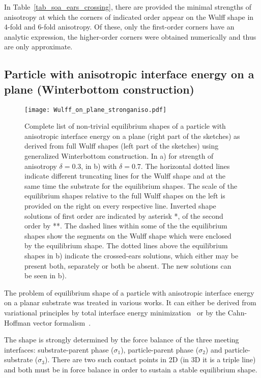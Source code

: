 	In Table~\ref{tab_soa_ears_crossing}, there are provided the minimal strengths of anisotropy at which the corners of indicated order appear on the Wulff shape in 4-fold and 6-fold anisotropy. Of these, only the first-order corners have an analytic expression, the higher-order corners were obtained numerically and thus are only approximate.
	
	\subsection{Particle with anisotropic interface energy on a plane (Winterbottom construction)}
	\begin{figure}[h]
		\centering
		\texttt{[image: Wulff\_on\_plane\_stronganiso.pdf]}
		\caption[Complete list of non-trivial equilibrium shapes of a particle with anisotropic interface energy on a plane]{Complete list of non-trivial equilibrium shapes of a particle with anisotropic interface energy on a plane (right part of the sketches) as derived from full Wulff shapes (left part of the sketches) using generalized Winterbottom construction. In a) for strength of anisotropy $\delta=0.3$, in b) with $\delta=0.7$. The horizontal dotted lines indicate different truncating lines for the Wulff shape and at the same time the substrate for the equilibrium shapes. The scale of the equilibrium shapes relative to the full Wulff shapes on the left is provided on the right on every respective line. Inverted shape solutions of first order are indicated by asterisk *, of the second order by **. The dashed lines within some of the the equilibrium shapes show the segments on the Wulff shape which were enclosed by the equilibrium shape. The dotted lines above the equilibrium shapes in b) indicate the crossed-ears solutions, which either may be present both, separately or both be absent. The new solutions can be seen in b).}
		\label{fig_wulffonplane_solutions_sketches}
	\end{figure}
	The problem of equilibrium shape of a particle with anisotropic interface energy on a planar substrate was treated in various works. It can either be derived from variational principles by total interface energy minimization~\cite{Winterbottom1967, Mariaux2011} or by the Cahn-Hoffman vector formalism~\cite{Cahn1974}. 
	
	The shape is strongly determined by the force balance of the three meeting interfaces: substrate-parent phase ($\sigma_1$), particle-parent phase ($\sigma_2$) and particle-substrate ($\sigma_3$). There are two such contact points in 2D (in 3D it is a triple line) and both must be in force balance in order to sustain a stable equilibrium shape. 
	
